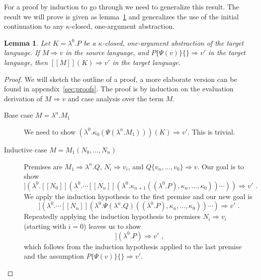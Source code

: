 \documentclass[a4paper,11pt,draft]{article}
\newtheorem{lemma}{\sffamily Lemma}
\begin{document}
For a proof by induction to go through we need to generalize this result. The
result we will prove is given as lemma~\ref{lem:mainlemma} and generalizes the
use of the initial continuation to any $\kappa$-closed, one-argument
abstraction.

\begin{lemma}\label{lem:mainlemma}
  Let $K = \lambda^{0}.P$ be a $\kappa$-closed, one-argument
  abstraction of the target language. If $M \Rightarrow v$ in the
  source language, and $P\{\Psi(v)\}\{\} \Rightarrow v'$ in the target
  language, then $[\![M]\!](K) \Rightarrow v'$ in the target language.
\end{lemma}

\begin{proof}
We will sketch the outline of a proof, a more elaborate version can be found in
appendix~\ref{sec:proofs}. The proof is by induction on the evaluation derivation
of $M \Rightarrow v$ and case analysis over the term $M$.
\begin{description}
\item[\sffamily Base case $M = \lambda^{n}.M_{1}$]\hfill

  We need to show
  $(\lambda^{0}.\kappa_{0}(\Psi(\lambda^{n}.M_{1}))) (K) \Rightarrow v'$.
  This is trivial.

\item[\sffamily Inductive case $M = M_{1}(N_{0}, \ldots, N_{n})$]\hfill

  Premises are $M_{1} \Rightarrow \lambda^{n}.Q$, $N_{i} \Rightarrow v_{i}$,
  and $Q\{v_{n}, \ldots, v_{0}\} \Rightarrow v$. Our goal is to show
  \begin{equation*}
    [\![M_{1}]\!]
    (\lambda^{0}.[\![N_{0}]\!](\lambda^{0}. \cdots
    [\![N_{n}]\!](\lambda^{0}.\kappa_{n+1}((\lambda^{0}.P), \kappa_{n},
    \ldots, \kappa_{0})) \cdots ))
    \Rightarrow v' \text{ .}
  \end{equation*}
  We apply the induction hypothesis to the first premise and our new goal is
  \begin{equation*}
    [\![N_{0}]\!]
    (\lambda^{0}. \cdots [\![N_{n}]\!](\lambda^{0}.\Psi(\lambda^{n}.Q)
    ((\lambda^{0}.P), \kappa_{n}, \ldots, \kappa_{0})) \cdots )
    \Rightarrow v' \text{ .}
  \end{equation*}
  Repeatedly applying the induction hypothesis to premises
  $N_{i} \Rightarrow v_{i}$ (starting with $i=0$) leaves us to show
  \begin{equation*}
    [\![Q\{v_{n}, \ldots, v_{0}\}]\!] (\lambda^{0}.P) \Rightarrow v' \text{ ,}
  \end{equation*}
  which follows from the induction hypothesis applied to the last premise and
  the assumption $P\{\Psi(v)\}\{\} \Rightarrow v'$.


\end{description}
\end{proof}
\end{document}
